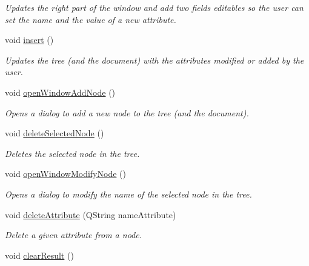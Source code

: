\begin{DoxyCompactItemize}
\begin{DoxyCompactList}\small\item\em Updates the right part of the window and add two fields editables so the user can set the name and the value of a new attribute. \end{DoxyCompactList}\item 
\hypertarget{classMainWindow_a05d44eee1bef57891a25366b45e6c3b2}{void \hyperlink{classMainWindow_a05d44eee1bef57891a25366b45e6c3b2}{insert} ()}\label{classMainWindow_a05d44eee1bef57891a25366b45e6c3b2}

\begin{DoxyCompactList}\small\item\em Updates the tree (and the document) with the attributes modified or added by the user. \end{DoxyCompactList}\item 
\hypertarget{classMainWindow_add4a43152e4abb3e68c1541a2663e794}{void \hyperlink{classMainWindow_add4a43152e4abb3e68c1541a2663e794}{open\-Window\-Add\-Node} ()}\label{classMainWindow_add4a43152e4abb3e68c1541a2663e794}

\begin{DoxyCompactList}\small\item\em Opens a dialog to add a new node to the tree (and the document). \end{DoxyCompactList}\item 
\hypertarget{classMainWindow_aa0322653d852753a24a8974027c23f16}{void \hyperlink{classMainWindow_aa0322653d852753a24a8974027c23f16}{delete\-Selected\-Node} ()}\label{classMainWindow_aa0322653d852753a24a8974027c23f16}

\begin{DoxyCompactList}\small\item\em Deletes the selected node in the tree. \end{DoxyCompactList}\item 
\hypertarget{classMainWindow_a29fc99dbacbd3e451df12f6e6b01d7be}{void \hyperlink{classMainWindow_a29fc99dbacbd3e451df12f6e6b01d7be}{open\-Window\-Modify\-Node} ()}\label{classMainWindow_a29fc99dbacbd3e451df12f6e6b01d7be}

\begin{DoxyCompactList}\small\item\em Opens a dialog to modify the name of the selected node in the tree. \end{DoxyCompactList}\item 
void \hyperlink{classMainWindow_a7ead9d2b3de68f8ca35c3c4234c3316b}{delete\-Attribute} (Q\-String name\-Attribute)
\begin{DoxyCompactList}\small\item\em Delete a given attribute from a node. \end{DoxyCompactList}\item 
\hypertarget{classMainWindow_a85bdf02a928c14f368a54ab2fa92cc05}{void \hyperlink{classMainWindow_a85bdf02a928c14f368a54ab2fa92cc05}{clear\-Result} ()}\label{classMainWindow_a85bdf02a928c14f368a54ab2fa92cc05}


\end{DoxyCompactItemize}
